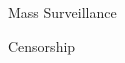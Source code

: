 \documentclass[nobackground,dvipsnames,table]{beamer}
\begin{document}
\begin{frame}{}%
    Mass Surveillance
\end{frame}

\begin{frame}{}
\end{frame}

\begin{frame}{}
\end{frame}

\begin{frame}{}
\end{frame}

\begin{frame}{}
\end{frame}

\begin{frame}{}%
    Censorship
\end{frame}



\backpage
\end{document}
